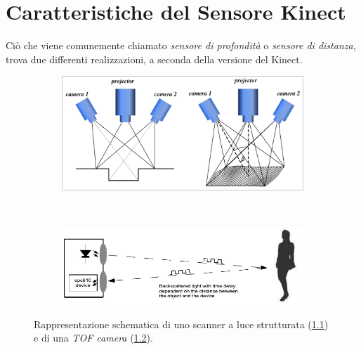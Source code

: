 
\chapter{Caratteristiche del Sensore Kinect} %
\label{chap:kinect}

Ciò che viene comunemente chiamato \emph{sensore di profondità} o \emph{sensore di distanza}, trova due differenti realizzazioni, a seconda della versione del Kinect.

\begin{figure}[h]
    \centering
    \begin{subfigure}[b]{0.48\textwidth}
    \includegraphics[width=\linewidth]{img/3d-structured-light-scanner.png}
        \caption{}
        \label{fig:3d_scanner}
    \end{subfigure}
    ~ %
    \begin{subfigure}[b]{0.48\textwidth}
    \includegraphics[width=\linewidth]{img/tof_camera.jpg}
        \caption{}
        \label{fig:tof_camera}
    \end{subfigure}
    \caption{Rappresentazione schematica di uno scanner a luce strutturata (\ref{fig:3d_scanner}) e di una \emph{TOF camera} (\ref{fig:tof_camera}).}
    \label{fig:distance_sensor}
\end{figure}


